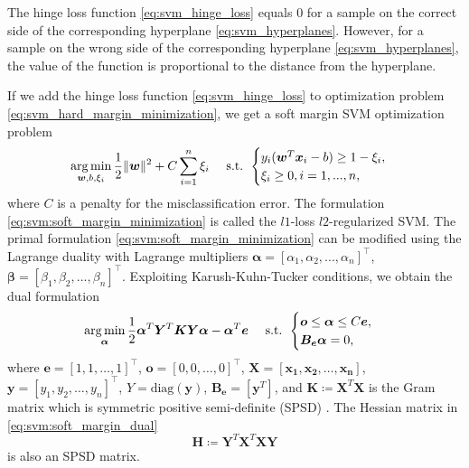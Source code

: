 The hinge loss function \eqref{eq:svm_hinge_loss} equals $0$ for a sample on the correct side of the corresponding hyperplane \eqref{eq:svm_hyperplanes}. However, for a sample on the wrong side of the corresponding hyperplane \eqref{eq:svm_hyperplanes}, the value of the function is proportional to the distance from the hyperplane.

If we add the hinge loss function \eqref{eq:svm_hinge_loss} to optimization problem \eqref{eq:svm_hard_margin_minimization}, we get a soft margin SVM optimization problem
\begin{equation}
    \operatorname*{arg\,min}_{\boldsymbol{w},b,\xi_i} \frac{1}{2}\|\boldsymbol{w}\|^2 + C\sum_{i = 1}^n\xi_i\quad \text{ s.t. }
    \begin{cases}
        y_i(\boldsymbol{w}^T\boldsymbol{x}_i-b)\geq1 - \xi_i,\\
        \xi_i \geq 0 , i=1, ...,n,
    \end{cases}
    \label{eq:svm:soft_margin_minimization}
\end{equation}
where \( C \) is a penalty for the misclassification error. The formulation \eqref{eq:svm:soft_margin_minimization} is called the $l1$-loss $l2$-regularized SVM. The primal formulation \eqref{eq:svm:soft_margin_minimization} can be modified using the Lagrange duality with Lagrange multipliers $\boldsymbol{\alpha} = [\alpha_1, \alpha_2, ..., \alpha_n]^{\top}$, $\boldsymbol{\beta} = [\beta_1, \beta_2, ..., \beta_n]^{\top}$. Exploiting Karush-Kuhn-Tucker conditions, we obtain the dual formulation
\begin{equation}
    \operatorname*{arg\,min}_{\boldsymbol{\alpha}} \frac{1}{2} \boldsymbol{\alpha}^T\boldsymbol{Y}^T\boldsymbol{K}\boldsymbol{Y}\boldsymbol{\alpha} - \boldsymbol{\alpha}^T\boldsymbol{e}\quad \text{ s.t. } 
    \begin{cases}
        \boldsymbol{o} \leq \boldsymbol{\alpha} \leq C\boldsymbol{e},\\
        \boldsymbol{B_e}\boldsymbol{\alpha}=0,
    \end{cases}
    \label{eq:svm:soft_margin_dual}
\end{equation}
where \( \boldsymbol{e} = [1,1, \dots,1]^{\top} \), \( \boldsymbol{o} = [0,0, \dots,0]^{\top} \), \( \boldsymbol{X} = [\boldsymbol{x_1},\boldsymbol{x_2}, \dots,\boldsymbol{x_n}] \), \( \boldsymbol{y} = [y_1,y_2, \dots,y_n]^{\top} \), \( Y = \text{diag}(\boldsymbol{y}) \), \( \boldsymbol{B_e} = [\boldsymbol{y}^T] \), and \( \boldsymbol{K}\coloneqq\boldsymbol{X}^T\boldsymbol{X} \) is the Gram matrix which is symmetric positive semi-definite (SPSD) \cite{Aeta2018}. The Hessian matrix in \eqref{eq:svm:soft_margin_dual}
\begin{equation}
    \boldsymbol{H} \coloneqq \boldsymbol{Y}^T\boldsymbol{X}^T\boldsymbol{X}\boldsymbol{Y}
    \label{eq:svm:hessian}
\end{equation}
is also an SPSD matrix.

